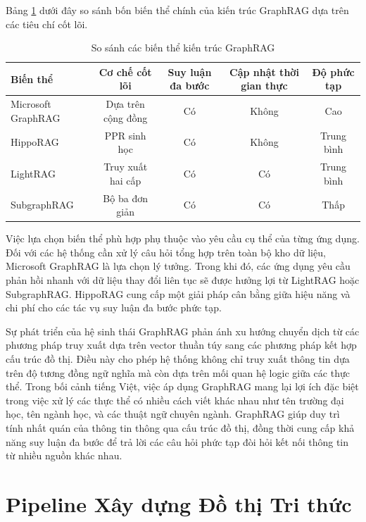 Bảng \ref{tab:graphrag_variants_comparison} dưới đây so sánh bốn biến thể chính của kiến trúc GraphRAG dựa trên các tiêu chí cốt lõi.

\begin{table}[htbp]
\centering
\caption{So sánh các biến thể kiến trúc GraphRAG}
\label{tab:graphrag_variants_comparison}
\begin{tabular}{|l|c|c|c|c|}
\hline
\textbf{Biến thể} & \textbf{Cơ chế cốt lõi} & \textbf{Suy luận đa bước} & \textbf{Cập nhật thời gian thực} & \textbf{Độ phức tạp} \\
\hline
Microsoft GraphRAG & Dựa trên cộng đồng & Có & Không & Cao \\
\hline
HippoRAG & PPR sinh học & Có & Không & Trung bình \\
\hline
LightRAG & Truy xuất hai cấp & Có & Có & Trung bình \\
\hline
SubgraphRAG & Bộ ba đơn giản & Có & Có & Thấp \\
\hline
\end{tabular}
\end{table}

Việc lựa chọn biến thể phù hợp phụ thuộc vào yêu cầu cụ thể của từng ứng dụng. Đối với các hệ thống cần xử lý câu hỏi tổng hợp trên toàn bộ kho dữ liệu, Microsoft GraphRAG là lựa chọn lý tưởng. Trong khi đó, các ứng dụng yêu cầu phản hồi nhanh với dữ liệu thay đổi liên tục sẽ được hưởng lợi từ LightRAG hoặc SubgraphRAG. HippoRAG cung cấp một giải pháp cân bằng giữa hiệu năng và chi phí cho các tác vụ suy luận đa bước phức tạp.

Sự phát triển của hệ sinh thái GraphRAG phản ánh xu hướng chuyển dịch từ các phương pháp truy xuất dựa trên vector thuần túy sang các phương pháp kết hợp cấu trúc đồ thị. Điều này cho phép hệ thống không chỉ truy xuất thông tin dựa trên độ tương đồng ngữ nghĩa mà còn dựa trên mối quan hệ logic giữa các thực thể. Trong bối cảnh tiếng Việt, việc áp dụng GraphRAG mang lại lợi ích đặc biệt trong việc xử lý các thực thể có nhiều cách viết khác nhau như tên trường đại học, tên ngành học, và các thuật ngữ chuyên ngành. GraphRAG giúp duy trì tính nhất quán của thông tin thông qua cấu trúc đồ thị, đồng thời cung cấp khả năng suy luận đa bước để trả lời các câu hỏi phức tạp đòi hỏi kết nối thông tin từ nhiều nguồn khác nhau.

\section{Pipeline Xây dựng Đồ thị Tri thức}
\label{sec:kg_pipeline}

